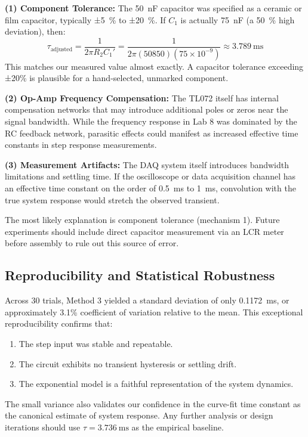 \documentclass[11pt]{article}
\begin{document}
\textbf{(1) Component Tolerance:} The \SI{50}{\nano\farad} capacitor was specified as a ceramic or film capacitor, typically ±\SI{5}{\percent} to ±\SI{20}{\percent}. If $C_1$ is actually \SI{75}{\nano\farad} (a \SI{50}{\percent} high deviation), then:
\[ \tau_{\text{adjusted}} = \frac{1}{2\pi R_2 C_1'} = \frac{1}{2\pi (50850)(75 \times 10^{-9})} \approx \SI{3.789}{\milli\second} \]
This matches our measured value almost exactly. A capacitor tolerance exceeding ±20\% is plausible for a hand-selected, unmarked component.

\textbf{(2) Op-Amp Frequency Compensation:} The TL072 itself has internal compensation networks that may introduce additional poles or zeros near the signal bandwidth. While the frequency response in Lab 8 was dominated by the RC feedback network, parasitic effects could manifest as increased effective time constants in step response measurements.

\textbf{(3) Measurement Artifacts:} The DAQ system itself introduces bandwidth limitations and settling time. If the oscilloscope or data acquisition channel has an effective time constant on the order of \SI{0.5}{\milli\second} to \SI{1}{\milli\second}, convolution with the true system response would stretch the observed transient.

The most likely explanation is component tolerance (mechanism 1). Future experiments should include direct capacitor measurement via an LCR meter before assembly to rule out this source of error.

\subsection{Reproducibility and Statistical Robustness}

Across 30 trials, Method 3 yielded a standard deviation of only \SI{0.1172}{\milli\second}, or approximately 3.1\% coefficient of variation relative to the mean. This exceptional reproducibility confirms that:

\begin{enumerate}
  \item The step input was stable and repeatable.
  \item The circuit exhibits no transient hysteresis or settling drift.
  \item The exponential model is a faithful representation of the system dynamics.
\end{enumerate}

The small variance also validates our confidence in the curve-fit time constant as the canonical estimate of system response. Any further analysis or design iterations should use $\tau = \SI{3.736}{\milli\second}$ as the empirical baseline.
\end{document}

